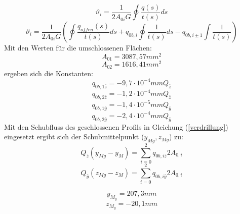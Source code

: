 \begin{equation}\label{verdrillung}
	\vartheta_{i} = \frac{1}{2A_{0i}G}\oint\frac{q(s)}{t(s)}ds
\end{equation}
\begin{equation}
	\vartheta_{i} = \frac{1}{2A_{0i}G}(\oint\frac{q_{offen}(s)}{t(s)}ds+q_{0b,i}\oint\frac{1}{t(s)}ds-q_{0b,i\pm1}\int\frac{1}{t(s)})
\end{equation}
Mit den Werten für die umschlossenen Flächen:
\begin{equation}
	A_{01}=3087,57mm^2
\end{equation}
\begin{equation}
	A_{02}=1616,41mm^2
\end{equation}
ergeben sich die Konstanten:
\begin{equation}
	q_{0b,1\bar{z}}=-9,7\cdot10^{-4}mmQ_{\bar{z}}
\end{equation}
\begin{equation}
	q_{0b,2\bar{z}}=-1,2\cdot10^{-4}mmQ_{\bar{z}}
\end{equation}
\begin{equation}
	q_{0b,1\bar{y}}=-1,4\cdot10^{-5}mmQ_{\bar{y}}
\end{equation}
\begin{equation}
	q_{0b,2\bar{y}}=-2,4\cdot10^{-4}mmQ_{\bar{y}}
\end{equation}
Mit den Schubfluss des geschlossenen Profils in Gleichung (\ref{verdrillung}) eingesetzt ergibt sich der Schubmittelpunkt ($y_{Mg}, z_{Mg}$) zu:
\begin{equation}
	Q_{\bar{z}}(y_{Mg}-y_{M})=\sum_{i=0}^{2}q_{0b,i\bar{z}}2A_{0,i}
\end{equation}
\begin{equation}
Q_{\bar{y}}(z_{Mg}-z_{M})=\sum_{i=0}^{2}q_{0b,i\bar{y}}2A_{0,i}
\end{equation}

\begin{equation}
	y_{M_{g}}=207,3mm
\end{equation}
\begin{equation}
	z_{M_{g}}=-20,1mm
\end{equation}

